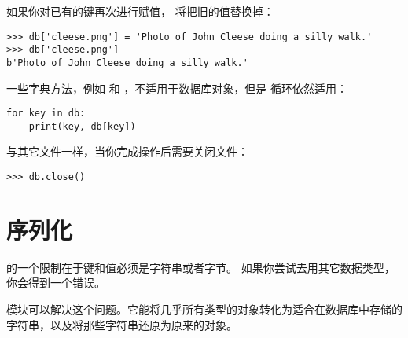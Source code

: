 {{{{{{{如果你对已有的键再次进行赋值， 将把旧的值替换掉：


\begin{lstlisting}
>>> db['cleese.png'] = 'Photo of John Cleese doing a silly walk.'
>>> db['cleese.png']
b'Photo of John Cleese doing a silly walk.'
\end{lstlisting}
%


一些字典方法，例如  和  ，不适用于数据库对象，但是  循环依然适用：

\begin{lstlisting}
for key in db:
    print(key, db[key])
\end{lstlisting}

%

与其它文件一样，当你完成操作后需要关闭文件：

\begin{lstlisting}
>>> db.close()
\end{lstlisting}
%
  


\section{序列化}


 的一个限制在于键和值必须是字符串或者字节。
如果你尝试去用其它数据类型，你会得到一个错误。
 


 模块可以解决这个问题。它能将几乎所有类型的对象转化为适合在数据库中存储的字符串，以及将那些字符串还原为原来的对象。


}}}}}}}
